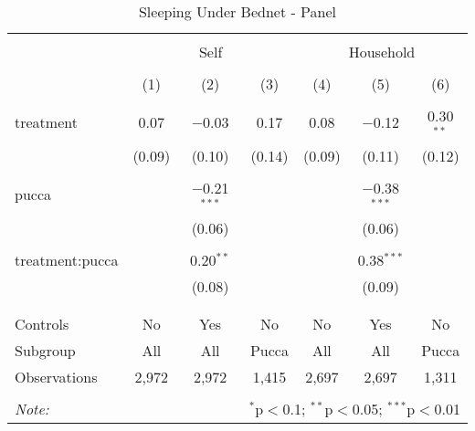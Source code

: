 
\begin{table}[!htbp] \centering 
  \caption{Sleeping Under Bednet - Panel} 
  \label{tbl:Sleeping Under Bednet - Panel} 
\begin{tabular}{@{\extracolsep{5pt}}lcccccc} 
\\[-1.8ex]\hline 
\hline \\[-1.8ex] 
 & \multicolumn{3}{c}{Self} & \multicolumn{3}{c}{Household} \\ 
\\[-1.8ex] & (1) & (2) & (3) & (4) & (5) & (6)\\ 
\hline \\[-1.8ex] 
 treatment & 0.07 & $-$0.03 & 0.17 & 0.08 & $-$0.12 & 0.30$^{**}$ \\ 
  & (0.09) & (0.10) & (0.14) & (0.09) & (0.11) & (0.12) \\ 
  & & & & & & \\ 
 pucca &  & $-$0.21$^{***}$ &  &  & $-$0.38$^{***}$ &  \\ 
  &  & (0.06) &  &  & (0.06) &  \\ 
  & & & & & & \\ 
 treatment:pucca &  & 0.20$^{**}$ &  &  & 0.38$^{***}$ &  \\ 
  &  & (0.08) &  &  & (0.09) &  \\ 
  & & & & & & \\ 
\hline \\[-1.8ex] 
Controls & No & Yes & No & No & Yes & No \\ 
Subgroup & All & All & Pucca & All & All & Pucca \\ 
Observations & 2,972 & 2,972 & 1,415 & 2,697 & 2,697 & 1,311 \\ 
\hline 
\hline \\[-1.8ex] 
\textit{Note:}  & \multicolumn{6}{r}{$^{*}$p$<$0.1; $^{**}$p$<$0.05; $^{***}$p$<$0.01} \\ 
\end{tabular} 
\end{table} 
